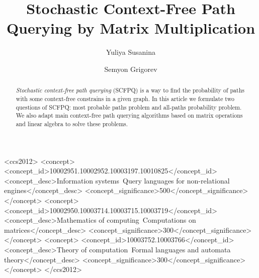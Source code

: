 \documentclass[sigconf, 10pt]{acmart}
\begin{document}
\fancyhead{}

\title{Stochastic Context-Free Path Querying by Matrix Multiplication}

\author{Yuliya Susanina}


\author{Semyon Grigorev}



\begin{abstract}
\emph{Stochastic context-free path querying} (SCFPQ) is a way to find the probability of paths with some context-free constrains in a given graph. In this article we formulate two questions of SCFPQ: most probable paths problem and all-paths probability problem. We also adapt main context-free path querying algorithms based on matrix operations and linear algebra to solve these problems.
\end{abstract}

\begin{CCSXML}
<ccs2012>
<concept>
<concept_id>10002951.10002952.10003197.10010825</concept_id>
<concept_desc>Information systems~Query languages for non-relational engines</concept_desc>
<concept_significance>500</concept_significance>
</concept>
<concept>
<concept_id>10002950.10003714.10003715.10003719</concept_id>
<concept_desc>Mathematics of computing~Computations on matrices</concept_desc>
<concept_significance>300</concept_significance>
</concept>
<concept>
<concept_id>10003752.10003766</concept_id>
<concept_desc>Theory of computation~Formal languages and automata theory</concept_desc>
<concept_significance>300</concept_significance>
</concept>
</ccs2012>
\end{CCSXML}
\end{document}
